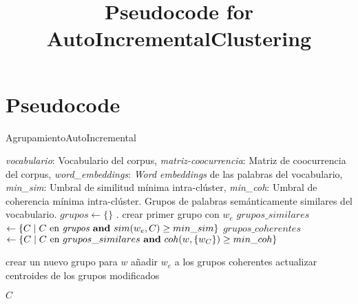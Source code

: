 \documentclass{article}
\begin{document}
	
	\title{Pseudocode for AutoIncrementalClustering}
	\author{}
	\date{}
	\maketitle
	
	\section*{Pseudocode}
		\begin{algorithm}
		\caption{\small AgrupamientoAutoIncremental}
		\begin{algorithmic}[1]
			\scriptsize
			\Require \textit{vocabulario}: Vocabulario del corpus, \textit{matriz-coocurrencia}: Matriz de coocurrencia del corpus, \textit{word\_embeddings}: \textit{Word embeddings} de las palabras del vocabulario, \textit{min\_sim}: Umbral de similitud m\'inima intra-cl\'uster, \textit{min\_coh}: Umbral de coherencia m\'inima intra-cl\'uster.
			\Ensure Grupos de palabras sem\'anticamente similares del vocabulario.
			\State $grupos \gets \{\}$ .
			\State crear primer grupo con $w_e$
			\Else
			\State $grupos\_similares$ $\gets \{ C \mid C \text{ en \textit{grupos} \textbf{and} } sim(w_e, C) \geq min\_sim \}$
			\State $grupos\_coherentes$ $\gets \{ C \mid C \text{ en $grupos\_similares$ \textbf{and} } coh(w, \{w_C\}) \geq min\_coh\}$
			
			\State crear un nuevo grupo para $w$
			\Else
			\State a\~nadir $w_e$ a los grupos coherentes
			\State actualizar centroides de los grupos modificados
			\EndIf
			\EndIf
			\EndFor
			
			\Return $C$
			\EndFunction
		\end{algorithmic}
	\end{algorithm}
\end{document}
